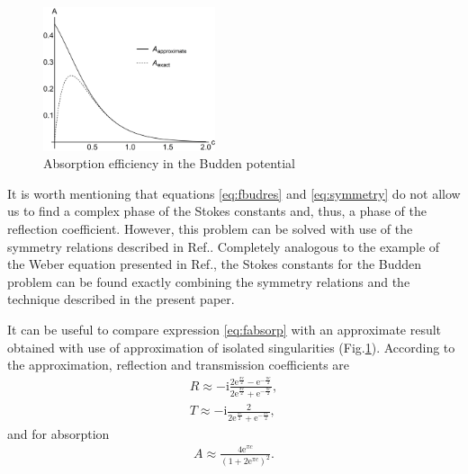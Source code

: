\documentclass[aip,jmp,reprint]{revtex4-1}
\def\rmi{\mathrm{i}}
\def\rme{\mathrm{e}}
\def\mytextwidth{0.45\textwidth}
\begin{document}
\begin{figure}
\centering
\noindent
\includegraphics[width=\mytextwidth]{absorp.png}
\caption{Absorption efficiency in the Budden potential}
\label{fig:absorp}
\end{figure} 

It is worth mentioning that equations \eqref{eq:fbudres} and \eqref{eq:symmetry} do not allow us
to find a complex phase of the Stokes constants and, thus, a phase of the reflection coefficient.
However, this problem can be solved with use of the symmetry relations described in 
Ref.. Completely analogous to the example of the Weber equation presented in
Ref., the Stokes constants for the Budden problem can be found exactly combining
the symmetry relations and the technique described in the present paper.

It can be useful to compare expression \eqref{eq:fabsorp} with an approximate result 
obtained with use of approximation of isolated singularities (Fig.\ref{fig:absorp}). According to the 
approximation\cite{rwbook}, reflection and transmission coefficients are
\begin{eqnarray}
R \approx 
-\rmi \frac{2 \rme^{\frac{\pi c}{2}} - \rme^{-\frac{\pi c}{2}}}{2 \rme^{\frac{\pi c}{2}} + \rme^{-\frac{\pi c}{2}}},
\\
T \approx -\rmi \frac{2}{2 \rme^{\frac{\pi c}{2}} + \rme^{-\frac{\pi c}{2}}},
\end{eqnarray}
and for absorption
\begin{eqnarray}
A \approx \frac{4 \rme^{\pi c}}{(1 + 2 \rme^{\pi c})^2}.
\label{eq:aisabsorp}
\end{eqnarray}
\end{document}
